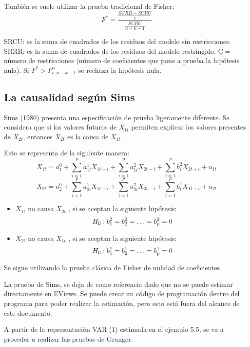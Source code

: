 Tambi\'{e}n se suele utilizar la prueba tradicional de Fisher:
\[
F^{\ast }=\frac{\frac{SCRR-SCRU}{c}}{\frac{SCRU}{n-k-1}}
\]

SRCU: es la suma de cuadrados de los residuos del modelo sin restricciones.\newline
SRRR: es la suma de cuadrados de los residuos del modelo restringido.\newline
C$=$ n\'{u}mero de restricciones (n\'{u}mero de coeficientes que pone a prueba la hip\'{o}tesis nula).
Si $F^{\ast }>F_{c;n-k-1}^{\alpha }$ se rechaza la hip\'{o}tesis nula.

\subsection{La causalidad seg\'{u}n Sims}
\label{subsubsec:mylabel13}
Sims (1980) presenta una especificaci\'{o}n de prueba ligeramente diferente. Se considera que si los valores futuros de $X_{1t}$ permiten explicar los valores presentes de $X_{2t}$, entonces $X_{2t}$ es la causa de $X_{1t}$ . 

Esto se representa de la siguiente manera:
\[
X_{1t}=a_{1}^{0}+\sum_{i=1}^p {a_{1i}^{1}X_{1t-i}} +\sum_{i=1}^p {a_{1i}^{2}X_{2t-i}} +\sum_{i=1}^p {b_{i}^{2}X_{2t+i}} +u_{1t}
\]
\[
X_{2t}=a_{2}^{0}+\sum_{i=1}^p {a_{2i}^{1}X_{1t-i}} +\sum_{i=1}^p {a_{2i}^{2}X_{2t-i}} +\sum_{i=1}^p {b_{i}^{1}X_{1t+i}} +u_{2t}
\]

\begin{itemize}
      \item $X_{1t}$ no causa $X_{2t}$ , si se aceptan la siguiente hip\'{o}tesis:
\[
H_{0}:b_{1}^{2}=b_{2}^{2}=\mathellipsis =b_{p}^{2}=0
\]
      \item $X_{2t}$ no causa $X_{1t}$ , si se aceptan la siguiente hip\'{o}tesis:
\[
H_{0}:b_{1}^{1}=b_{2}^{1}=\mathellipsis =b_{p}^{1}=0
\]
\end{itemize}

Se sigue utilizando la prueba cl\'{a}sica de Fisher de nulidad de coeficientes.

\begin{observacion}
La prueba de Sims, se deja de como referencia dado que no se puede estimar directamente en EViews. Se puede crear un c\'{o}digo de programaci\'{o}n dentro del programa para poder realizar la estimaci\'{o}n, pero esto est\'{a} fuera del alcance de este documento. 
\end{observacion}

\begin{ejemplo}
A partir de la representaci\'{o}n VAR (1) estimada en el ejemplo 5.5, se va a proceder a realizar las pruebas de Granger.
\end{ejemplo}

